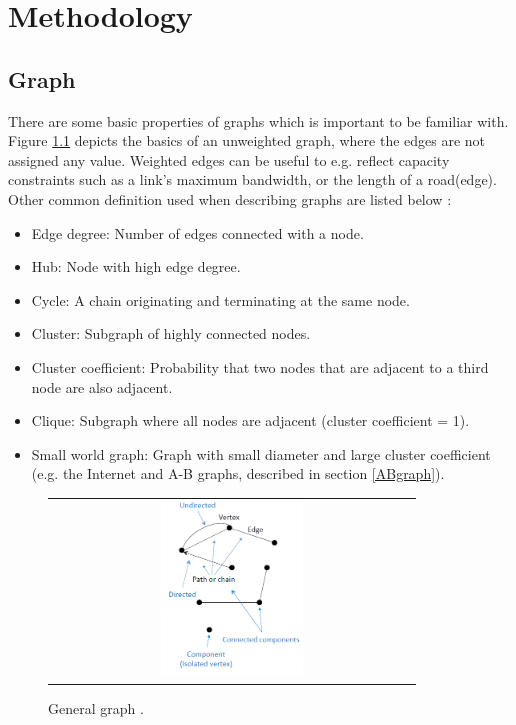 \chapter{Methodology}


\section{Graph}
There are some basic properties of graphs which is important to be familiar with. Figure \ref{fig:generalGraph} depicts the basics of an unweighted graph, where the edges are not assigned any value. Weighted edges can be useful to e.g. reflect capacity constraints such as a link's maximum bandwidth, or the length of a road(edge). Other common definition used when describing graphs are listed below \cite{audestad}:
\begin{itemize}
\item Edge degree: Number of edges connected with a node.
\item Hub: Node with high edge degree.
\item Cycle: A chain originating and terminating at the same node.
\item Cluster: Subgraph of highly connected nodes.
\item Cluster coefficient: Probability that two nodes that are adjacent to a third node are also adjacent.
\item Clique: Subgraph where all nodes are adjacent (cluster coefficient = 1).
\item Small world graph: Graph with small diameter and large cluster coefficient (e.g. the Internet and A-B graphs, described in section \ref{ABgraph}).
\end{itemize}

\begin{figure}[h]
\centering
\begin{tabular}{@{}c@{}}
\includegraphics[width=0.4\textwidth]{../Figures/generalGraph.png}
\end{tabular}
\caption{\label{fig:generalGraph} General graph \cite{audestad}.}
\end{figure}


